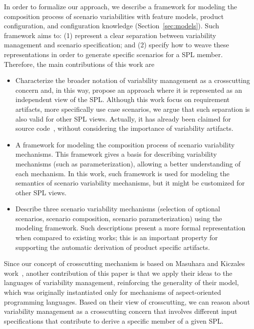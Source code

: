 \documentclass{acm_proc_article-sp}
\begin{document}
In order to formalize our approach, we describe a framework for modeling the
composition process of scenario variabilities with feature models, product
configuration, and configuration knowledge (Section~\ref{sec:models}). Such
framework aims to: (1) represent a clear separation between variability
management and scenario specification; and (2) specify how to weave these
representations in order to generate specific scenarios for a SPL member.
Therefore, the main contributions of this work are

\begin{itemize}

\item Characterize the broader notation of variability management as a
crosscutting concern and, in this way, propose an approach where it is 
represented as an independent view of the SPL. Although this work focus on
requirement artifacts, more specifically use case scenarios, we argue that such
separation is also valid for other SPL views. Actually, it has already been
claimed for source code~\cite{Alves:2006aa,Apel:2006aa}, without considering
the importance of variability artifacts.
  
\item A framework for modeling the composition process of scenario variability
mechanisms. This framework gives a basis for describing variability mechanisms
(such as parameterization), allowing a better understanding of each mechanism. In
this work, such framework is used for modeling the semantics of scenario
variability mechanisms, but it might be customized for other SPL views.

\item Describe three scenario variability mechanisms (selection of optional
scenarios, scenario composition, scenario parameterization) using the modeling
framework. Such descriptions present a more formal representation when compared
to existing works; this is an important property for supporting the automatic
derivation of product specific artifacts.

\end{itemize}

Since our concept of crosscutting mechanism is based on Masuhara and Kiczales
work~\cite{Masuhara:2003aa}, another contribution of this paper is that we apply
their ideas to the languages of variability management,  reinforcing the
generality of their model, which was originally instantiated only for mechanisms
of aspect-oriented programming languages. Based on their view of crosscutting, we
can reason about variability management as a crosscutting concern that involves
different input specifications that contribute to derive a specific member of a
given SPL.
\end{document}
